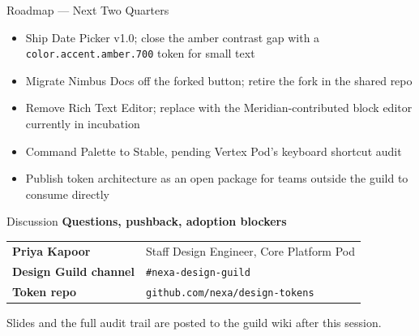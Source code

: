 \documentclass[aspectratio=169,10pt]{beamer}
\begin{document}
\begin{frame}{Roadmap --- Next Two Quarters}
  \small
  \begin{itemize}
    \item[\textbf{Q3 2026}] Ship Date Picker v1.0; close the amber contrast gap with a
      \texttt{color.accent.amber.700} token for small text
    \item[\textbf{Q3 2026}] Migrate Nimbus Docs off the forked button; retire the fork
      in the shared repo
    \item[\textbf{Q4 2026}] Remove Rich Text Editor; replace with the Meridian-contributed
      block editor currently in incubation
    \item[\textbf{Q4 2026}] Command Palette to Stable, pending Vertex Pod's keyboard
      shortcut audit
    \item[\textbf{Q1 2027}] Publish token architecture as an open package for teams
      outside the guild to consume directly
  \end{itemize}
\end{frame}

\begin{frame}{Discussion}
  \centering
  \vspace{0.6cm}
  {\Large\bfseries\color{nexateal} Questions, pushback, adoption blockers}
  \vspace{0.8cm}

  \begin{tabular}{@{}ll@{}}
    \textbf{Priya Kapoor} & Staff Design Engineer, Core Platform Pod \\
    \textbf{Design Guild channel} & \texttt{\#nexa-design-guild} \\
    \textbf{Token repo} & \texttt{github.com/nexa/design-tokens} \\
  \end{tabular}

  \vspace{1cm}
  {\scriptsize\color{nexagray}Slides and the full audit trail are posted to the guild wiki
  after this session.}
\end{frame}
\end{document}
